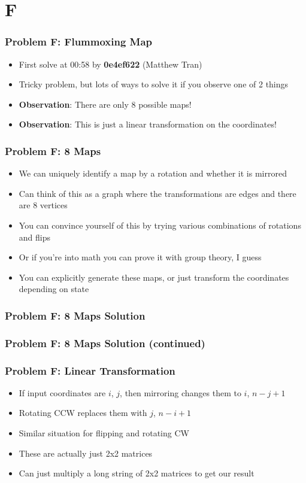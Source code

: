 \section{F}%
\label{sec:f}

\begin{frame}
  \frametitle{Problem F: Flummoxing Map}

  \begin{itemize}
    \item First solve at 00:58 by \textbf{0e4ef622} (Matthew Tran)
    \item Tricky problem, but lots of ways to solve it if you observe one of 2 things
    \item \textbf{Observation}: There are only 8 possible maps!
    \item \textbf{Observation}: This is just a linear transformation on the coordinates!
  \end{itemize}

\end{frame}

\begin{frame}
  \frametitle{Problem F: 8 Maps}
  \begin{itemize}
    \item We can uniquely identify a map by a rotation and whether it is mirrored
    \item Can think of this as a graph where the transformations are edges and there are 8 vertices
    \item You can convince yourself of this by trying various combinations of rotations and flips
    \item Or if you're into math you can prove it with group theory, I guess
    \item You can explicitly generate these maps, or just transform the coordinates depending on state
  \end{itemize}
\end{frame}

\begin{frame}
  \frametitle{Problem F: 8 Maps Solution}
\end{frame}

\begin{frame}
  \frametitle{Problem F: 8 Maps Solution (continued)}
\end{frame}

\begin{frame}
  \frametitle{Problem F: Linear Transformation}
  \begin{itemize}
    \item If input coordinates are $i$, $j$, then mirroring changes them to $i$, $n-j+1$
    \item Rotating CCW replaces them with $j$, $n-i+1$
    \item Similar situation for flipping and rotating CW
    \item These are actually just 2x2 matrices
    \item Can just multiply a long string of 2x2 matrices to get our result
  \end{itemize}
\end{frame}
